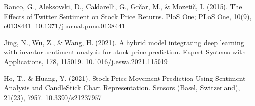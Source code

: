 \documentclass{llncs}
\begin{document}
\begin{thebibliography}{8}
\label{ref_article10} 
Ranco, G., Aleksovski, D., Caldarelli, G., Grčar, M., \& Mozetič, I. (2015). The Effects of Twitter Sentiment on Stock Price Returns. PloS One; PLoS One, 10(9), e0138441. 10.1371/journal.pone.0138441

\label{ref_article11} 
Jing, N., Wu, Z., \& Wang, H. (2021). A hybrid model integrating deep learning with investor sentiment analysis for stock price prediction. Expert Systems with Applications, 178, 115019. 10.1016/j.eswa.2021.115019

\label{ref_article12}
Ho, T., \& Huang, Y. (2021). Stock Price Movement Prediction Using Sentiment Analysis and CandleStick Chart Representation. Sensors (Basel, Switzerland), 21(23), 7957. 10.3390/s21237957


\end{thebibliography}
\end{document}
